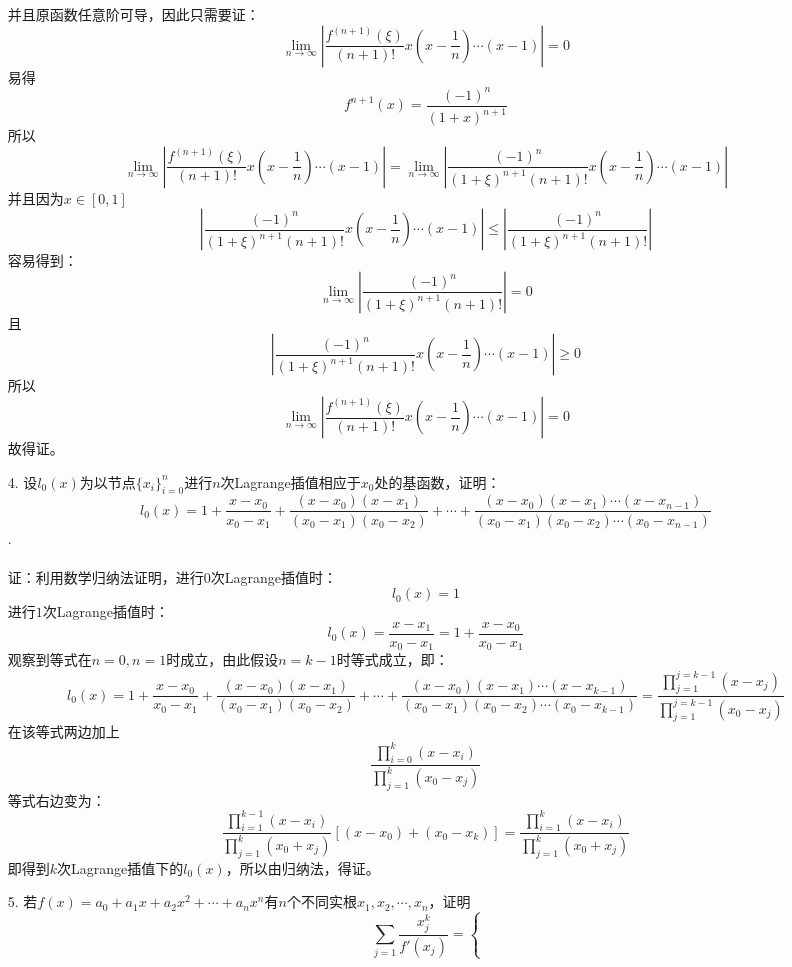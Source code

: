 \documentclass{article}
\begin{document}
\begin{itemize}
		并且原函数任意阶可导，因此只需要证：
		$$\lim\limits_{n\rightarrow \infty} \left|\frac{f^{(n+1)}(\xi)}{(n+1)!}x(x-\frac{1}{n})\cdots(x - 1)\right| = 0$$
		易得
		$$f^{n+1}(x) = \frac{(-1)^{n}}{(1+x)^{n+1}}$$
		所以
		$$\lim\limits_{n\rightarrow \infty} \left|\frac{f^{(n+1)}(\xi)}{(n+1)!}x(x-\frac{1}{n})\cdots(x - 1)\right| = \lim\limits_{n\rightarrow \infty}\left|\frac{(-1)^{n}}{(1+\xi)^{n+1}(n+1)!}x(x-\frac{1}{n})\cdots(x - 1)\right|$$
		并且因为$x \in [0,1]$
		$$\left| \frac{(-1)^{n}}{(1+\xi)^{n+1}(n+1)!}x(x-\frac{1}{n})\cdots(x - 1) \right| \le \left| \frac{(-1)^{n}}{(1+\xi)^{n+1}(n+1)!} \right|$$
		容易得到：
		$$\lim\limits_{n\rightarrow \infty}\left|\frac{(-1)^{n}}{(1+\xi)^{n+1}(n+1)!}\right| = 0$$
		且
		$$\left| \frac{(-1)^{n}}{(1+\xi)^{n+1}(n+1)!}x(x-\frac{1}{n})\cdots(x - 1)\right| \ge 0$$
		所以
		$$\lim\limits_{n\rightarrow \infty} \left|\frac{f^{(n+1)}(\xi)}{(n+1)!}x(x-\frac{1}{n})\cdots(x - 1)\right|=0$$
		故得证。\\
		\item[4.]设$l_{0}(x)为以节点\{x_{i}\}^{n}_{i = 0}$进行$n$次Lagrange插值相应于$x_{0}$处的基函数，证明：
		$$l_{0}(x) = 1 + \frac{x - x_{0}}{x_{0} - x_{1}} + \frac{(x - x_{0})(x-x_{1})}{(x_{0} - x_{1})(x_{0} - x_{2})} + \cdots +\frac{(x - x_{0})(x-x_{1})\cdots(x-x_{n-1})}{(x_{0} - x_{1})(x_{0} - x_{2})\cdots(x_{0} - x_{n-1})}$$.\\\\
		证：利用数学归纳法证明，进行$0$次Lagrange插值时：
		$$l_{0}(x) = 1$$
		进行$1$次Lagrange插值时：
		$$l_{0}(x) = \frac{x - x_{1}}{x_{0} - x_{1}} = 1 + \frac{x - x_{0}}{x_{0} - x_{1}}$$
		观察到等式在$n = 0,n = 1$时成立，由此假设$n = k-1$时等式成立，即：
		$$l_{0}(x) = 1 + \frac{x - x_{0}}{x_{0} - x_{1}} + \frac{(x - x_{0})(x-x_{1})}{(x_{0} - x_{1})(x_{0} - x_{2})} + \cdots +\frac{(x - x_{0})(x-x_{1})\cdots(x-x_{k-1})}{(x_{0} - x_{1})(x_{0} - x_{2})\cdots(x_{0} - x_{k-1})}=\frac{\prod_{j = 1}^{j = k - 1}(x - x_{j})}{\prod_{j = 1}^{j = k - 1}(x_{0} - x_{j})}$$
		在该等式两边加上
		$$\frac{\prod_{i = 0}^{k}(x - x_{i})}{\prod_{j = 1}^{k}(x_{0} - x_{j})}$$
		等式右边变为：
		$$\frac{\prod_{i = 1}^{k - 1}(x - x_{i})}{\prod_{j = 1}^{k}(x_{0} + x_{j})}[(x - x_{0}) +(x_{0} -x_{k})] = \frac{\prod_{i = 1}^{k}(x - x_{i})}{\prod_{j = 1}^{k}(x_{0} + x_{j})}$$
		即得到$k$次Lagrange插值下的$l_{0}(x)$，所以由归纳法，得证。\\
		\item[5.]若$f(x) = a_{0} +a_{1}x + a_{2}x^2 + \cdots + a_{n}x^{n}$有$n$个不同实根$x_{1},x_{2},\cdots, x_{n}$，证明
				$$ \sum_{j=1}\frac{x^{k}_{j}}{f'(x_{j})}=\left\{
$$
\end{itemize}
\end{document}
